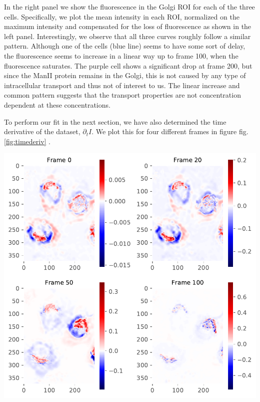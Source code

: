 \documentclass{Dissertate}
\let\origfigure\figure
\let\endorigfigure\endfigure
\renewenvironment{figure}[1][2] {
    \expandafter\origfigure\expandafter[H]
} {
    \endorigfigure
}
\begin{document}
In the right panel we show the fluorescence in the Golgi ROI for each of
the three cells. Specifically, we plot the mean intensity in each ROI,
normalized on the maximum intensity and compensated for the loss of
fluorescence as shown in the left panel. Interestingly, we observe that
all three curves roughly follow a similar pattern. Although one of the
cells (blue line) seems to have some sort of delay, the fluorescence
seems to increase in a linear way up to frame 100, when the fluorescence
saturates. The purple cell shows a significant drop at frame 200, but
since the ManII protein remains in the Golgi, this is not caused by any
type of intracellular transport and thus not of interest to us. The
linear increase and common pattern suggests that the transport
properties are not concentration dependent at these concentrations.

To perform our fit in the next section, we have also determined the time
derivative of the dataset, \(\partial_tI\). We plot this for four
different frames in figure fig.\ref{fig:timederiv} .

\begin{figure}
\hypertarget{fig:timederiv}{%
\centering
\includegraphics{source/figures/pdf/time_deriv.pdf}
\caption{The determined time derivative four different frames of the
ManII RUSH experiments.}\label{fig:timederiv}
}
\end{figure}
\end{document}

